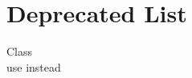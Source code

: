 \chapter{Deprecated List}
\hypertarget{deprecated}{}\label{deprecated}

\begin{DoxyRefList}
\item[Class \doxylink{classMapperLib_1_1SingleLinkage}{Mapper\+Lib\+::Single\+Linkage} ]\hfill \\
\label{deprecated__deprecated000001}%
%
use  instead 
\end{DoxyRefList}